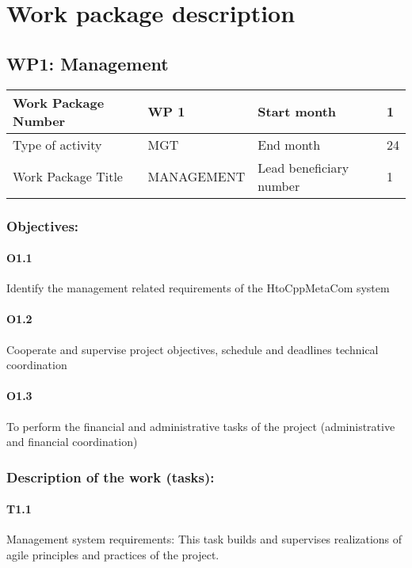 \documentclass{article}
\begin{document}
\newpage
\section{Work package description}

\subsection{WP1: Management}

\begin{center}
	\begin{tabular}{ |p{3cm}|p{4cm}||p{2cm}|p{1cm}| }
		\hline
		Work Package Number & WP 1 & Start month & 1  \\ \hline
		Type of activity & MGT & End month & 24 \\ \hline
		Work Package Title & MANAGEMENT & Lead beneficiary number & 1 \\ \hline
	\end{tabular}
\end{center}

\subsubsection{Objectives:}
 \paragraph{O1.1}Identify the management related requirements of the HtoCppMetaCom system
 \paragraph{O1.2} Cooperate and supervise project objectives, schedule and deadlines technical coordination
 \paragraph{O1.3} To perform the financial and administrative tasks of the project (administrative and financial coordination)
	 
\subsubsection{Description of the work (tasks):}
 \paragraph{T1.1} Management system requirements: This task builds and
 supervises realizations of agile principles and practices of the project.
\end{document}
